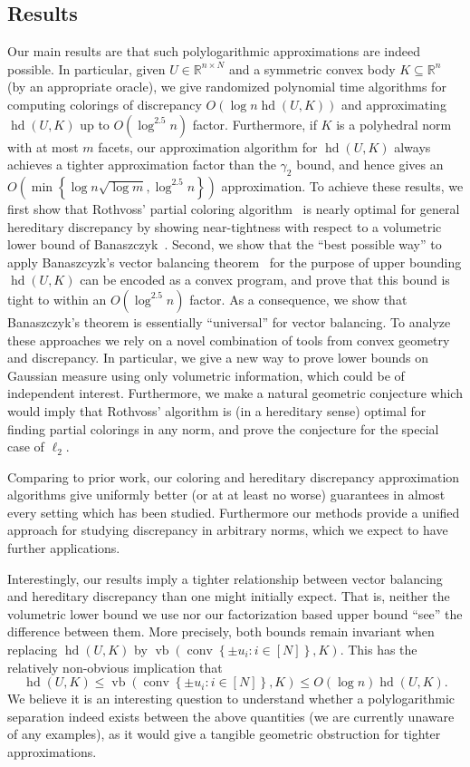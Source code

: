 \documentclass[11pt]{article}
\newcommand{\R}{{\mathbb{R}}}
\newcommand{\set}[1]{\left\{ #1 \right\}}
\DeclareMathOperator{\hd}{hd}
\DeclareMathOperator{\vb}{vb}
\DeclareMathOperator{\conv}{conv}
\begin{document}
\subsection{Results} 
Our main results are that such polylogarithmic approximations are indeed
possible. In particular, given $U \in \R^{n \times N}$ and a symmetric convex
body $K \subseteq \R^n$ (by an appropriate oracle), we give randomized
polynomial time algorithms for computing colorings of discrepancy $O(\log n
\hd(U,K))$ and approximating $\hd(U,K)$ up to $O(\log^{2.5} n)$ factor.
Furthermore, if $K$ is a polyhedral norm with at most $m$ facets, our
approximation algorithm for $\hd(U,K)$ always achieves a tighter approximation
factor than the $\gamma_2$ bound, and hence gives an $O(\min \set{\log n
\sqrt{\log m}, \log^{2.5} n})$ approximation. To achieve these results, we first
show that Rothvoss' partial coloring algorithm~\cite{rothvoss-giann} is nearly
optimal for general hereditary discrepancy by showing near-tightness with
respect to a volumetric lower bound of Banaszczyk~\cite{Bana93}. Second, we show
that the ``best possible way'' to apply Banaszcyzk's vector balancing
theorem~\cite{bana} for the purpose of upper bounding $\hd(U,K)$ can be
encoded as a convex program, and prove that this bound is tight to within an
$O(\log^{2.5} n)$ factor. As a consequence, we show that Banaszczyk's theorem is
essentially ``universal'' for vector balancing. To analyze these approaches we
rely on a novel combination of tools from convex geometry and discrepancy. In
particular, we give a new way to prove lower bounds on Gaussian measure using
only volumetric information, which could be of independent interest.
Furthermore, we make a natural geometric conjecture which would imply that
Rothvoss' algorithm is (in a hereditary sense) optimal for finding partial colorings
in any norm, and prove the conjecture for the special case of $\ell_2$.

Comparing to prior work, our coloring and hereditary discrepancy
approximation algorithms give uniformly better (or at at least no worse)
guarantees in almost every setting which has been studied. Furthermore our
methods provide a unified approach for studying discrepancy in arbitrary norms,
which we expect to have further applications.

Interestingly, our results imply a tighter relationship between vector balancing
and hereditary discrepancy than one might initially expect. That is,
neither the volumetric lower bound we use nor our factorization based upper
bound ``see'' the difference between them. More precisely, both bounds remain
invariant when replacing $\hd(U,K)$ by $\vb(\conv\set{\pm u_i: i \in [N]},K)$. This
has the relatively non-obvious implication that 
\begin{equation}
\label{eq:hd-to-vb}
\hd(U,K) \leq \vb(\conv\set{\pm u_i: i \in [N]},K) \leq O(\log n) \hd(U,K).
\end{equation}
We believe it is an interesting question to understand whether a polylogarithmic
separation indeed exists between the above quantities (we are currently unaware
of any examples), as it would give a tangible geometric obstruction for tighter
approximations.    
\end{document}
